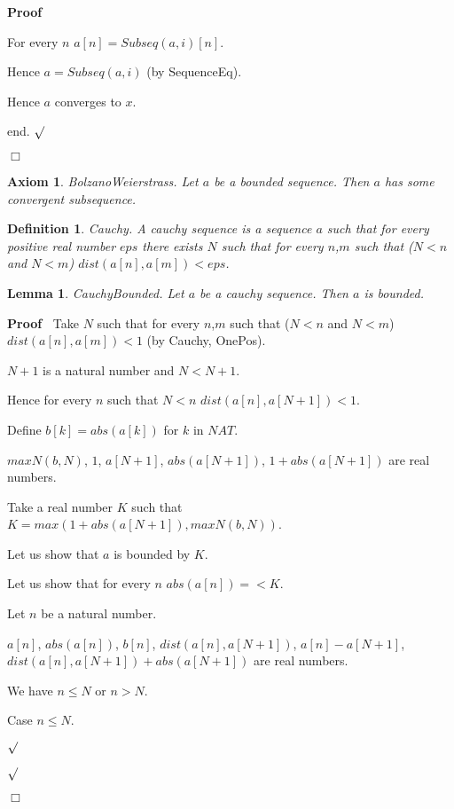 \documentclass{article}
\newenvironment{forthel}{\begin{leftbar}}{\end{leftbar}}
\newenvironment{proof}{\noindent\textbf{Proof\ }}{\hspace*{\fill}$\Box$\medskip}
\newenvironment{subproof}{\begin{list}{}{}
		\item[\text{Proof}]}{\hfill $\surd$ \end{list}}
\newtheorem{axiom}{Axiom}
\newtheorem{lemma}{Lemma}
\newtheorem{definition}{Definition}
\begin{document}
\begin{forthel}
\begin{proof}
\begin{subproof}
			For every $n$ $a[n] = Subseq(a,i)[n]$.
		
			Hence $a = Subseq(a,i)$ (by SequenceEq).
		
			Hence $a$ converges to $x$.
			
			end.
		\end{subproof}
	\end{proof}

	\begin{axiom}
		BolzanoWeierstrass.
		Let $a$ be a bounded sequence. Then $a$ has some convergent subsequence.
	\end{axiom}
	
	\begin{definition}
		Cauchy.
		A cauchy sequence is a sequence $a$ such that for every positive real number $eps$ there exists $N$ such that
		for every $n$,$m$ such that ($N < n$ and $N < m$) $dist(a[n],a[m]) < eps$.
	\end{definition}
	
	\begin{lemma}
		CauchyBounded.
		Let $a$ be a cauchy sequence. Then $a$ is bounded.
	\end{lemma}
	\begin{proof}
		Take $N$ such that for every $n$,$m$ such that ($N < n$ and $N < m$) $dist(a[n],a[m]) < 1$ (by Cauchy, OnePos).
		
		$N + 1$ is a natural number and $N < N + 1$.
		
		Hence for every $n$ such that $N < n$ $dist(a[n],a[N + 1]) < 1$.
		
		Define $b[k] = abs(a[k])$ for $k$ in $NAT$.

		$maxN(b,N)$, $1$, $a[N + 1]$, $abs(a[N + 1])$, $1 + abs(a[N + 1])$ are real numbers.
		
		Take a real number $K$ such that $K = max(1 + abs(a[N + 1]), maxN(b,N))$.
		
		Let us show that $a$ is bounded by $K$.
		
		\begin{subproof}
			Let us show that for every $n$ $abs(a[n]) =< K$. 
		
			\begin{subproof}
				Let $n$ be a natural number.
		
				$a[n]$, $abs(a[n])$, $b[n]$, $dist(a[n],a[N + 1])$, $a[n] - a[N + 1]$, $dist(a[n],a[N + 1]) + abs(a[N + 1])$ are real numbers.
		
				We have $n \leq N$ or $n > N$.
		
				Case $n \leq N$.
		

\end{subproof}
\end{subproof}
\end{proof}
\end{forthel}
\end{document}
